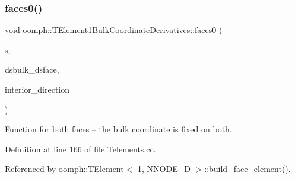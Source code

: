 \subsubsection{\texorpdfstring{faces0()}{faces0()}}
{\footnotesize\ttfamily void oomph\+::\+T\+Element1\+Bulk\+Coordinate\+Derivatives\+::faces0 (\begin{DoxyParamCaption}\item[{const \hyperlink{classoomph_1_1Vector}{Vector}$<$ double $>$ \&}]{s,  }\item[{\hyperlink{classoomph_1_1DenseMatrix}{Dense\+Matrix}$<$ double $>$ \&}]{dsbulk\+\_\+dsface,  }\item[{unsigned \&}]{interior\+\_\+direction }\end{DoxyParamCaption})}



Function for both faces -- the bulk coordinate is fixed on both. 



Definition at line 166 of file Telements.\+cc.



Referenced by oomph\+::\+T\+Element$<$ 1, N\+N\+O\+D\+E\+\_\+D $>$\+::build\+\_\+face\+\_\+element().

